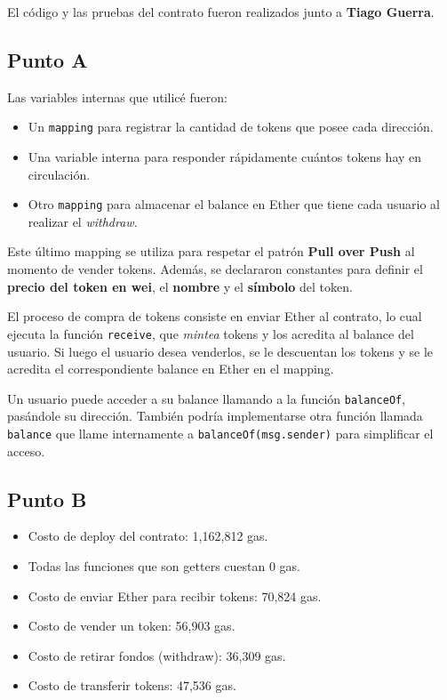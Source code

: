 \documentclass[12pt]{article}
\begin{document}
El código y las pruebas del contrato fueron realizados junto a \textbf{Tiago Guerra}.

\subsection{Punto A}

Las variables internas que utilicé fueron:

\begin{itemize}
\item Un \texttt{mapping} para registrar la cantidad de tokens que posee cada dirección.  
\item Una variable interna para responder rápidamente cuántos tokens hay en circulación.  
\item Otro \texttt{mapping} para almacenar el balance en Ether que tiene cada usuario al realizar el \emph{withdraw}.  
\end{itemize}

Este último mapping se utiliza para respetar el patrón \textbf{Pull over Push} al momento de vender tokens.  
Además, se declararon constantes para definir el \textbf{precio del token en wei}, el \textbf{nombre} y el \textbf{símbolo} del token.

El proceso de compra de tokens consiste en enviar Ether al contrato, lo cual ejecuta la función \texttt{receive}, que \emph{mintea} tokens y los acredita al balance del usuario.  
Si luego el usuario desea venderlos, se le descuentan los tokens y se le acredita el correspondiente balance en Ether en el mapping.

Un usuario puede acceder a su balance llamando a la función \texttt{balanceOf}, pasándole su dirección.  
También podría implementarse otra función llamada \texttt{balance} que llame internamente a \texttt{balanceOf(msg.sender)} para simplificar el acceso.

\subsection{Punto B}

\begin{itemize}
\item Costo de deploy del contrato: 1,162,812 gas.
\item Todas las funciones que son getters cuestan 0 gas.
\item Costo de enviar Ether para recibir tokens: 70,824 gas.
\item Costo de vender un token: 56,903 gas.
\item Costo de retirar fondos (withdraw): 36,309 gas.
\item Costo de transferir tokens: 47,536 gas.
\end{itemize}
\end{document}

